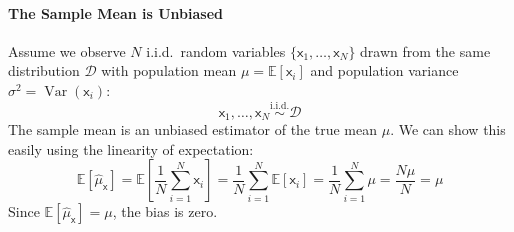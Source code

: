 \paragraph*{The Sample Mean is Unbiased}
Assume we observe $N$ i.i.d.\ random variables $\{\mathsf{x}_1, \dots, \mathsf{x}_N\}$ drawn from the same distribution $\mathcal{D}$ with population mean $\mu=\mathbb{E}[\mathsf{x}_i]$ and population variance $\sigma^2=\operatorname{Var}(\mathsf{x}_i)$:
\begin{equation}
\mathsf{x}_1,\ldots,\mathsf{x}_N \stackrel{\text{i.i.d.}}{\sim} \mathcal{D}
\label{eq:iid-samples}
\end{equation}
The sample mean is an unbiased estimator of the true mean $\mu$. We can show this easily using the linearity of expectation:
\begin{equation}
    \mathbb{E}[\hat{\mu}_{\mathsf{x}}] = \mathbb{E}\left[\frac{1}{N}\sum_{i=1}^N \mathsf{x}_i\right] = \frac{1}{N}\sum_{i=1}^N \mathbb{E}[\mathsf{x}_i] = \frac{1}{N}\sum_{i=1}^N \mu = \frac{N\mu}{N} = \mu
\end{equation}
Since $\mathbb{E}[\hat{\mu}_{\mathsf{x}}] = \mu$, the bias is zero.

